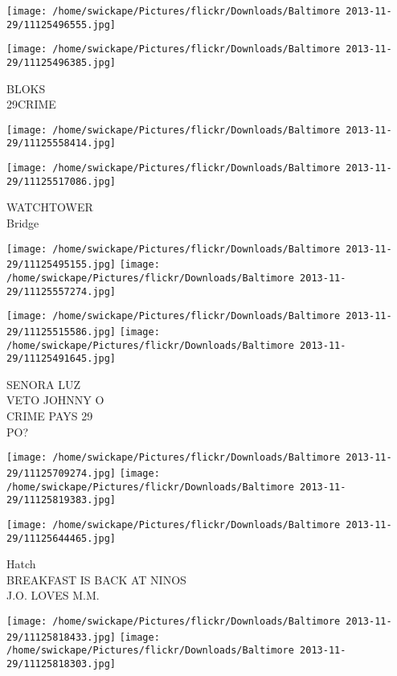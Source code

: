 \documentclass[10pt,letterpaper]{article}
\begin{document}
\texttt{[image: /home/swickape/Pictures/flickr/Downloads/Baltimore 2013-11-29/11125496555.jpg]}

\vspace{0.25in}
\texttt{[image: /home/swickape/Pictures/flickr/Downloads/Baltimore 2013-11-29/11125496385.jpg]}

BLOKS\\
29CRIME\\
\pagebreak

\texttt{[image: /home/swickape/Pictures/flickr/Downloads/Baltimore 2013-11-29/11125558414.jpg]}

\vspace{0.25in}
\texttt{[image: /home/swickape/Pictures/flickr/Downloads/Baltimore 2013-11-29/11125517086.jpg]}

WATCHTOWER\\
Bridge\\
\pagebreak

\texttt{[image: /home/swickape/Pictures/flickr/Downloads/Baltimore 2013-11-29/11125495155.jpg]}
\texttt{[image: /home/swickape/Pictures/flickr/Downloads/Baltimore 2013-11-29/11125557274.jpg]}

\texttt{[image: /home/swickape/Pictures/flickr/Downloads/Baltimore 2013-11-29/11125515586.jpg]}
\texttt{[image: /home/swickape/Pictures/flickr/Downloads/Baltimore 2013-11-29/11125491645.jpg]}

SENORA LUZ\\
VETO JOHNNY O\\
CRIME PAYS 29\\
PO?\\
\pagebreak

\texttt{[image: /home/swickape/Pictures/flickr/Downloads/Baltimore 2013-11-29/11125709274.jpg]}
\texttt{[image: /home/swickape/Pictures/flickr/Downloads/Baltimore 2013-11-29/11125819383.jpg]}

\vspace{0.25in}
\texttt{[image: /home/swickape/Pictures/flickr/Downloads/Baltimore 2013-11-29/11125644465.jpg]}

Hatch\\
BREAKFAST IS BACK AT NINOS\\
J.O. LOVES M.M.\\
\pagebreak

\texttt{[image: /home/swickape/Pictures/flickr/Downloads/Baltimore 2013-11-29/11125818433.jpg]}
\texttt{[image: /home/swickape/Pictures/flickr/Downloads/Baltimore 2013-11-29/11125818303.jpg]}
\end{document}

